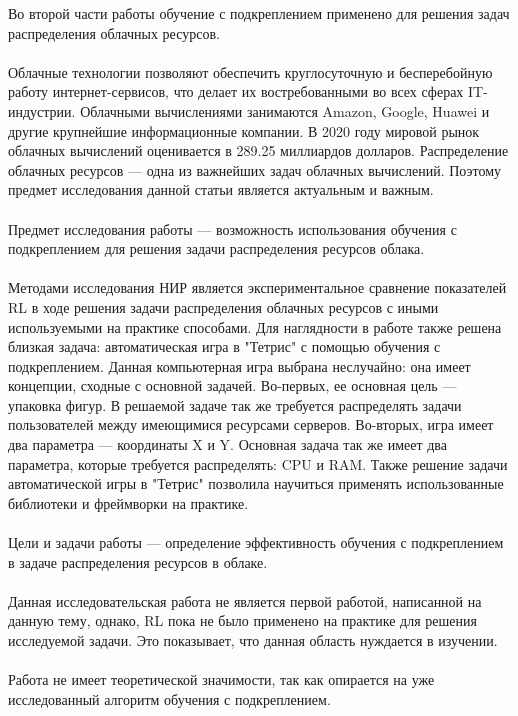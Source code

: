 \documentclass{article}
\begin{document}
Во второй части работы обучение с подкреплением применено для решения задач распределения облачных ресурсов.\\
~\\
Облачные технологии позволяют обеспечить круглосуточную и бесперебойную работу интернет-сервисов, что делает их востребованными во всех сферах IT-индустрии. Облачными вычислениями занимаются Amazon, Google, Huawei и другие крупнейшие информационные компании\cite{litlink2}\cite{litlink3}. В 2020 году мировой рынок облачных вычислений оценивается в 289.25 миллиардов долларов\cite{litlink4}. Распределение облачных ресурсов — одна из важнейших задач облачных вычислений. Поэтому предмет исследования данной статьи является актуальным и важным.\\
~\\
Предмет исследования работы — возможность использования обучения с подкреплением для решения задачи распределения ресурсов облака.\\
~\\
Методами исследования НИР является экспериментальное сравнение показателей RL в ходе решения задачи распределения облачных ресурсов с иными используемыми на практике способами. Для наглядности в работе также решена близкая задача: автоматическая игра в "Тетрис" с помощью обучения с подкреплением.  Данная компьютерная игра выбрана неслучайно: она имеет концепции, сходные с основной задачей. Во-первых, ее основная цель — упаковка фигур. В решаемой задаче так же требуется распределять задачи пользователей между имеющимися ресурсами серверов. Во-вторых, игра имеет два параметра — координаты X и Y. Основная задача так же имеет два параметра, которые требуется распределять: CPU и RAM. Также решение задачи автоматической игры в "Тетрис" позволила научиться применять использованные библиотеки и фреймворки на практике.\\
~\\
Цели и задачи работы — определение эффективность обучения с подкреплением в задаче распределения ресурсов в облаке.\\
~\\
Данная исследовательская работа не является первой работой, написанной на данную тему, однако, RL пока не было применено на практике для решения исследуемой задачи. Это показывает, что данная область нуждается в изучении.\\
~\\
Работа не имеет теоретической значимости, так как опирается на уже исследованный алгоритм обучения с подкреплением.\\
\end{document}

